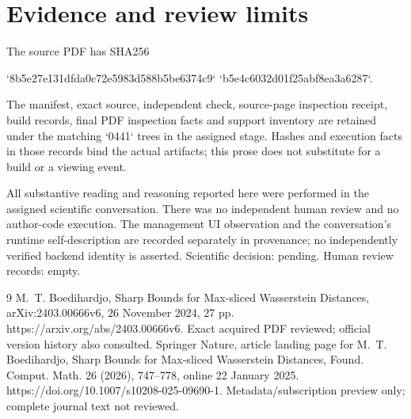 \documentclass[10pt]{article}
\begin{document}
\section*{Evidence and review limits}
The source PDF has SHA256\par
`8b5e27e131dfda0c72e5983d588b5be6374c9`
`b5e4c6032d01f25abf8ea3a6287`.\par
The manifest, exact source, independent check, source-page inspection receipt, build records, final PDF inspection facts and support inventory are retained under the matching `0441` trees in the assigned stage. Hashes and execution facts in those records bind the actual artifacts; this prose does not substitute for a build or a viewing event.\par
All substantive reading and reasoning reported here were performed in the assigned scientific conversation. There was no independent human review and no author-code execution. The management UI observation and the conversation’s runtime self-description are recorded separately in provenance; no independently verified backend identity is asserted. Scientific decision: pending. Human review records: empty.\par
9 M. T. Boedihardjo, Sharp Bounds for Max-sliced Wasserstein Distances, arXiv:2403.00666v6, 26 November 2024, 27 pp. https://arxiv.org/abs/2403.00666v6. Exact acquired PDF reviewed; official version history also consulted. Springer Nature, article landing page for M. T. Boedihardjo, Sharp Bounds for Max-sliced Wasserstein Distances, Found. Comput. Math. 26 (2026), 747–778, online 22 January 2025. https://doi.org/10.1007/s10208-025-09690-1. Metadata/subscription preview only; complete journal text not reviewed.\par
\end{document}
